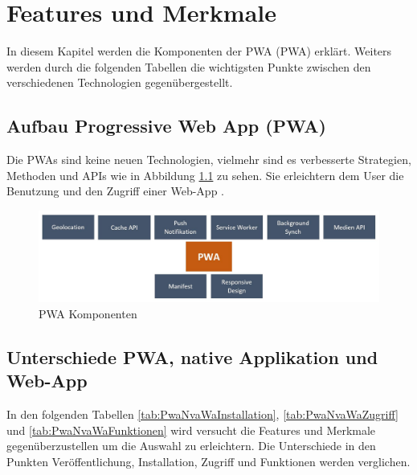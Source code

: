 \chapter{Features und Merkmale}\label{chab:FeaturesundMerkmale}
\thispagestyle{standard}
\pagestyle{standard}
\renewcommand{\footrulewidth}{0.4pt}
In diesem Kapitel werden die Komponenten der \acl{PWA} (\acs{PWA}) erklärt. Weiters werden durch die folgenden Tabellen die wichtigsten Punkte zwischen den verschiedenen Technologien  gegenübergestellt.

\section{Aufbau Progressive Web App (PWA)}
Die \acs{PWA}s sind keine neuen Technologien, vielmehr sind es verbesserte Strategien, Methoden und APIs wie in Abbildung \ref{fig:Komponenten} zu sehen. 
Sie erleichtern dem User die Benutzung und den Zugriff einer \acs{Web-App} \cite{AlternativePWA}. 

\begin{figure}[h]
	\centering
	\includegraphics[width=14cm]{BilderAllgemein/PWA_Features}\medskip
	\caption{PWA Komponenten}
	\label{fig:Komponenten}
\end{figure}

\section{Unterschiede PWA, native Applikation und Web-App}\label{chap:UnterschiedePWA,NativeApplikationundWeb-Apps}
In den folgenden Tabellen \ref{tab:PwaNvaWaInstallation}, \ref{tab:PwaNvaWaZugriff} und \ref{tab:PwaNvaWaFunktionen}  wird versucht die Features und Merkmale gegenüberzustellen um die Auswahl zu erleichtern. Die Unterschiede in den Punkten Veröffentlichung, Installation, Zugriff und Funktionen werden verglichen.


